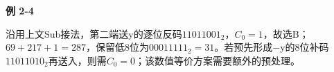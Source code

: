 {\color{ink}\bfseries 例 2-4}\par\vspace{1bp}沿用上文Sub接法，第二端送y的逐位反码\(1101 1001_{2}\)，\(C_{0}=\allowbreak{}1\)，故选B；\(69+\allowbreak{}217+\allowbreak{}1=\allowbreak{}287\)，保留低8位为\(0001 1111_{2}=\allowbreak{}31\)。若预先形成\(-\)y的8位补码\(1101 1010_{2}\)再送入，则需\(C_{0}=\allowbreak{}0\)；该数值等价方案需要额外的预处理。
